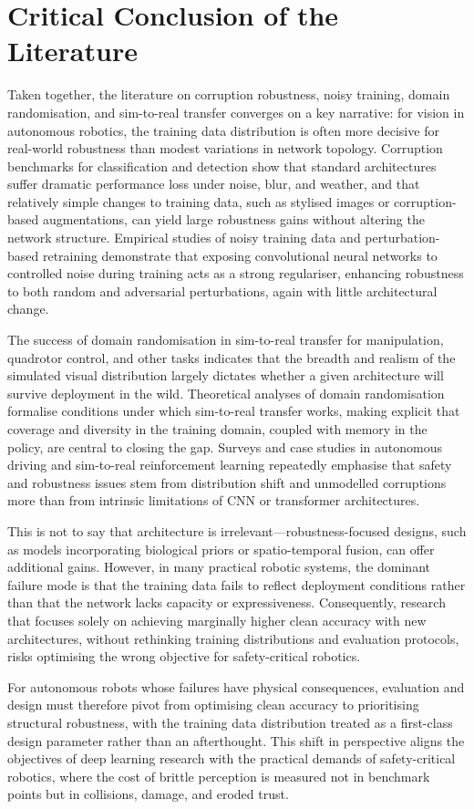 \documentclass[11pt,a4paper]{article}
\begin{document}
\section{Critical Conclusion of the Literature}
Taken together, the literature on corruption robustness, noisy training, domain randomisation, and sim-to-real transfer converges on a key narrative: for vision in autonomous robotics, the training data distribution is often more decisive for real-world robustness than modest variations in network topology. Corruption benchmarks for classification and detection show that standard architectures suffer dramatic performance loss under noise, blur, and weather, and that relatively simple changes to training data, such as stylised images or corruption-based augmentations, can yield large robustness gains without altering the network structure. Empirical studies of noisy training data and perturbation-based retraining demonstrate that exposing convolutional neural networks to controlled noise during training acts as a strong regulariser, enhancing robustness to both random and adversarial perturbations, again with little architectural change.

The success of domain randomisation in sim-to-real transfer for manipulation, quadrotor control, and other tasks indicates that the breadth and realism of the simulated visual distribution largely dictates whether a given architecture will survive deployment in the wild. Theoretical analyses of domain randomisation formalise conditions under which sim-to-real transfer works, making explicit that coverage and diversity in the training domain, coupled with memory in the policy, are central to closing the gap. Surveys and case studies in autonomous driving and sim-to-real reinforcement learning repeatedly emphasise that safety and robustness issues stem from distribution shift and unmodelled corruptions more than from intrinsic limitations of CNN or transformer architectures.

This is not to say that architecture is irrelevant---robustness-focused designs, such as models incorporating biological priors or spatio-temporal fusion, can offer additional gains. However, in many practical robotic systems, the dominant failure mode is that the training data fails to reflect deployment conditions rather than that the network lacks capacity or expressiveness. Consequently, research that focuses solely on achieving marginally higher clean accuracy with new architectures, without rethinking training distributions and evaluation protocols, risks optimising the wrong objective for safety-critical robotics.

For autonomous robots whose failures have physical consequences, evaluation and design must therefore pivot from optimising clean accuracy to prioritising structural robustness, with the training data distribution treated as a first-class design parameter rather than an afterthought. This shift in perspective aligns the objectives of deep learning research with the practical demands of safety-critical robotics, where the cost of brittle perception is measured not in benchmark points but in collisions, damage, and eroded trust.



\end{document}
